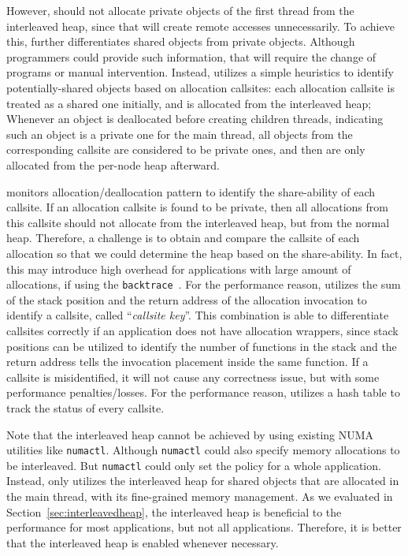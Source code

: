 However, \NA{} should not allocate private objects of the first thread from the interleaved heap, since that will create remote accesses unnecessarily. To achieve this, \NM{} further  differentiates shared objects from private objects. Although programmers could provide such information, that will require the change of programs or manual intervention. Instead, \NM{} utilizes a simple heuristics to identify potentially-shared objects based on allocation callsites: each allocation callsite is treated as a shared one initially, and is allocated from the interleaved heap; Whenever an object is deallocated before creating children threads, indicating such an object is a private one for the main thread,  all objects from the corresponding callsite are considered to be private ones, and then are only allocated from the per-node heap afterward. 

\NM{} monitors allocation/deallocation pattern to identify the share-ability of each callsite. If an allocation callsite is found to be private, then all allocations from this callsite should not allocate from the interleaved heap, but from the normal heap. Therefore, a challenge is to obtain and compare the callsite of each allocation so that we could determine the heap based on the share-ability. In fact, this may introduce high overhead for applications with large amount of allocations, if using the \texttt{backtrace}~\citep{DBLP:conf/icse/SumnerZWZ10, DBLP:conf/cgo/ZengR0AJ014}. For the performance reason, \NA{} utilizes the sum of the stack position and the return address of the allocation invocation to identify a callsite, called ``\textit{callsite key}''. This combination is able to differentiate callsites correctly if an application does not have allocation wrappers, since stack positions can be utilized to identify the number of functions in the stack and the return address tells the invocation placement inside the same function. If a callsite is misidentified, it will not cause any correctness issue, but with some performance penalties/losses. For the performance reason, \NA{} utilizes a hash table to track the status of every callsite. 
 
Note that the interleaved heap cannot be achieved by using existing NUMA utilities like \texttt{numactl}. Although \texttt{numactl} could also specify memory allocations to be interleaved. But \texttt{numactl} could only set the policy for a whole application. Instead, \NM{} only utilizes the interleaved heap for shared objects that are allocated in the main thread, with its fine-grained memory management. As we evaluated in Section~\ref{sec:interleavedheap}, the interleaved heap is beneficial to the performance for most applications, but not all applications.  Therefore, it is better that the interleaved heap is enabled whenever necessary. 

